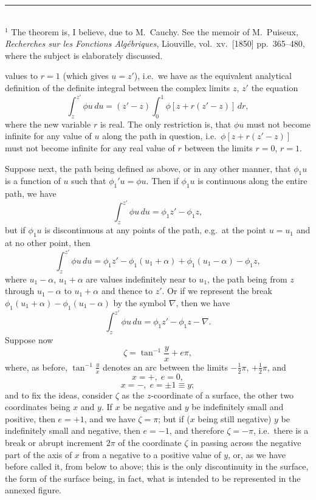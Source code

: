\documentclass[11pt]{article}
\begin{document}
\medskip
\noindent\rule{0.4\textwidth}{0.4pt}\\
\footnotesize{$^{1}$ The theorem is, I believe, due to M.\ Cauchy. See the memoir of M.\ Puiseux, \emph{Recherches sur les Fonctions Alg\'ebriques}, Liouville, vol.\ xv.\ [1850] pp.\ 365--480, where the subject is elaborately discussed.}\normalsize

\clearpage

values to $r=1$ (which gives $u=z'$), i.e.\ we have as the equivalent analytical definition of the definite integral between the complex limits $z$, $z'$ the equation
\[
\int_{z}^{z'}\!\phi u\,du = (z'-z)\int_{0}^{1}\!\phi[z+r(z'-z)]\,dr,
\]
where the new variable $r$ is real. The only restriction is, that $\phi u$ must not become infinite for any value of $u$ along the path in question, i.e.\ $\phi[z+r(z'-z)]$ must not become infinite for any real value of $r$ between the limits $r=0$, $r=1$.

\medskip
Suppose next, the path being defined as above, or in any other manner, that $\phi_{1}u$ is a function of $u$ such that $\phi_{1}'u=\phi u$. Then if $\phi_{1}u$ is continuous along the entire path, we have
\[
\int_{z}^{z'}\!\phi u\,du = \phi_{1}z' - \phi_{1}z,
\]
but if $\phi_{1}u$ is discontinuous at any points of the path, e.g.\ at the point $u=u_{1}$ and at no other point, then
\[
\int_{z}^{z'}\!\phi u\,du = \phi_{1}z' - \phi_{1}(u_{1}+\alpha) + \phi_{1}(u_{1}-\alpha) - \phi_{1}z,
\]
where $u_{1}-\alpha$, $u_{1}+\alpha$ are values indefinitely near to $u_{1}$, the path being from $z$ through $u_{1}-\alpha$ to $u_{1}+\alpha$ and thence to $z'$. Or if we represent the break $\phi_{1}(u_{1}+\alpha)-\phi_{1}(u_{1}-\alpha)$ by the symbol $\nabla$, then we have
\[
\int_{z}^{z'}\!\phi u\,du = \phi_{1}z' - \phi_{1}z - \nabla.
\]
Suppose now
\[
\zeta=\tan^{-1}\frac{y}{x}+e\pi,
\]
where, as before, $\tan^{-1}\frac{y}{x}$ denotes an arc between the limits $-\tfrac{1}{2}\pi$, $+\tfrac{1}{2}\pi$, and
\[
x=+,\;e=0,
\]
\[
x=-,\;e=\pm 1\equiv y;
\]
and to fix the ideas, consider $\zeta$ as the $z$-coordinate of a surface, the other two coordinates being $x$ and $y$. If $x$ be negative and $y$ be indefinitely small and positive, then $e=+1$, and we have $\zeta=\pi$; but if ($x$ being still negative) $y$ be indefinitely small and negative, then $e=-1$, and therefore $\zeta=-\pi$, i.e.\ there is a break or abrupt increment $2\pi$ of the coordinate $\zeta$ in passing across the negative part of the axis of $x$ from a negative to a positive value of $y$, or, as we have before called it, from below to above; this is the only discontinuity in the surface, the form of the surface being, in fact, what is intended to be represented in the annexed figure.
\end{document}
